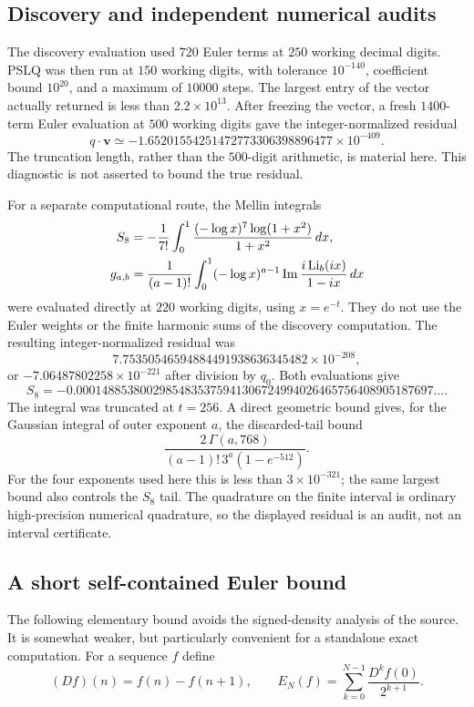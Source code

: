 \subsection{Discovery and independent numerical audits}
The discovery evaluation used $720$ Euler terms at $250$ working decimal
digits. PSLQ was then run at $150$ working digits, with tolerance
$10^{-140}$, coefficient bound $10^{20}$, and a maximum of $10000$
steps. The largest entry of the vector actually returned is less than
$2.2\times10^{13}$. After freezing the vector, a fresh $1400$-term
Euler evaluation at $500$ working digits gave the integer-normalized
residual
\begin{equation}\label{cont26:eq:s8-euler-residual}
 q\cdot\mathbf v\simeq
 -1.65201554251472773306398896477\times10^{-409}.
\end{equation}
The truncation length, rather than the $500$-digit arithmetic, is material
here. This diagnostic is not asserted to bound the true residual.

For a separate computational route, the Mellin integrals
\begin{align}
 S_8&=-\frac1{7!}\int_0^1
       \frac{(-\log x)^7\log(1+x^2)}{1+x^2}\,dx,
       \label{cont26:eq:s8-mellin}\\
 g_{a,b}&=\frac1{(a-1)!}\int_0^1(-\log x)^{a-1}
       \operatorname{Im}\frac{i\operatorname{Li}_b(ix)}{1-ix}\,dx
       \label{cont26:eq:gab-mellin}
\end{align}
were evaluated directly at $220$ working digits, using $x=e^{-t}$.
They do not use the Euler weights or the finite harmonic sums of the
discovery computation. The resulting integer-normalized residual was
\[
 7.75350546594884491938636345482\times10^{-208},
\]
or $-7.06487802258\times10^{-221}$ after division by $q_0$.
Both evaluations give
\[
 S_8=-0.00014885380029854835375941306724994026465756408905187697\ldots.
\]
The integral was truncated at $t=256$. A direct geometric bound gives,
for the Gaussian integral of outer exponent $a$, the discarded-tail bound
\[
 \frac{2\,\Gamma(a,768)}{(a-1)!\,3^a(1-e^{-512})}.
\]
For the four exponents used here this is less than $3\times10^{-321}$;
the same largest bound also controls the $S_8$ tail. The quadrature on
the finite interval is ordinary high-precision numerical quadrature,
so the displayed residual is an audit, not an interval certificate.

\subsection{A short self-contained Euler bound}
The following elementary bound avoids the signed-density analysis of
the source. It is somewhat weaker, but particularly convenient for a
standalone exact computation.
For a sequence $f$ define
\[
 (Df)(n)=f(n)-f(n+1),\qquad
 E_N(f)=\sum_{k=0}^{N-1}\frac{D^kf(0)}{2^{k+1}}.
\]

